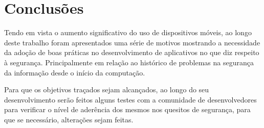 \section{Conclusões}
Tendo em vista o aumento significativo do uso de dispositivos móveis, ao longo deste trabalho foram apresentados uma série de motivos mostrando a necessidade da adoção de boas práticas no desenvolvimento de aplicativos no que diz respeito à segurança. Principalmente em relação ao histórico de problemas na segurança da informação desde o início da computação.

Para que os objetivos traçados sejam alcançados, ao longo do seu desenvolvimento serão feitos alguns testes com a comunidade de desenvolvedores para verificar o nível de aderência dos mesmos nos quesitos de segurança, para que se necessário, alterações sejam feitas.

